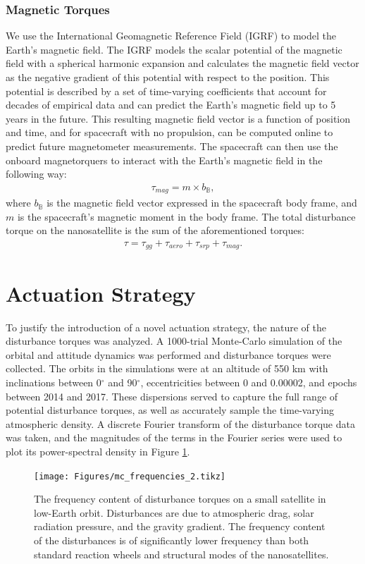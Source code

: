 \subsubsection{Magnetic Torques}
We use the International Geomagnetic Reference Field (IGRF) \cite{thebault2015} to model the Earth's magnetic field. The IGRF models the scalar potential of the magnetic field with a spherical harmonic expansion and calculates the magnetic field vector as the negative gradient of this potential with respect to the position.  This potential is described by a set of time-varying coefficients that account for decades of empirical data and can predict the Earth's magnetic field up to 5 years in the future. This resulting magnetic field vector is a function of position and time, and for spacecraft with no propulsion, can be computed online to predict future magnetometer measurements. The spacecraft can then use the onboard magnetorquers to interact with the Earth's magnetic field in the following way:
\begin{align}
    \tau_{mag} = m \times b_{\mathbb{B}},
\end{align}
where $b_{\mathbb{B}}$ is the magnetic field vector expressed in the spacecraft body frame, and $m$ is the spacecraft's magnetic moment in the body frame. The total disturbance torque on the nanosatellite is the sum of the aforementioned torques:
\begin{align}
    \tau = \tau_{gg} + \tau_{aero} + \tau_{srp} + \tau_{mag}.
\end{align}
\section{Actuation Strategy}
\label{sec:wigglesat:actuation}
To justify the introduction of a novel actuation strategy, the nature of the disturbance torques was analyzed.  A 1000-trial Monte-Carlo simulation of the orbital and attitude dynamics was performed and disturbance torques were collected. The orbits in the simulations were at an altitude of 550 km with inclinations between 0$^\circ$ and 90$^\circ$, eccentricities between 0 and 0.00002, and epochs between 2014 and 2017. These dispersions served to capture the full range of potential disturbance torques, as well as accurately sample the time-varying atmospheric density.  A discrete Fourier transform of the disturbance torque data was taken, and the magnitudes of the terms in the Fourier series were used to plot its power-spectral density in Figure \ref{fig:disturbances}. 
\begin{figure}%
    \centering
    \texttt{[image: Figures/mc\_frequencies\_2.tikz]}
    \caption{The frequency content of disturbance torques on a small satellite in low-Earth orbit. Disturbances are due to atmospheric drag, solar radiation pressure, and the gravity gradient. The frequency content of the disturbances is of significantly lower frequency than both standard reaction wheels and structural modes of the nanosatellites.}
    \label{fig:disturbances}
\end{figure}


